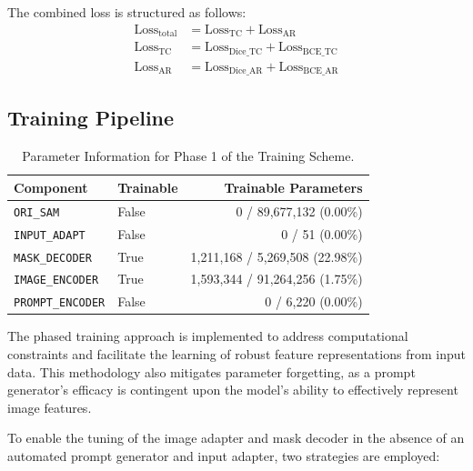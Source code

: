 The combined loss is structured as follows:
\begin{align*}
    \text{Loss}_{\text{total}} &= \text{Loss}_{\text{TC}} + \text{Loss}_{\text{AR}} \\
    \text{Loss}_{\text{TC}} &= \text{Loss}_{\text{Dice\_TC}} + \text{Loss}_{\text{BCE\_TC}} \\
    \text{Loss}_{\text{AR}} &= \text{Loss}_{\text{Dice\_AR}} + \text{Loss}_{\text{BCE\_AR}}
\end{align*}


\subsection{Training Pipeline}

\begin{table}[h!]
    \centering
    \caption{Parameter Information for Phase 1 of the Training Scheme.}
    \label{tab:phase1_params} %
    \begin{tabular}{l | l | r}
        \hline
        \textbf{Component} & \textbf{Trainable} & \textbf{Trainable Parameters} \\
        \hline
        \texttt{ORI\_SAM} & False & 0 / 89,677,132 (0.00\%) \\
        \texttt{INPUT\_ADAPT} & False & 0 / 51 (0.00\%) \\
        \texttt{MASK\_DECODER} & True & 1,211,168 / 5,269,508 (22.98\%) \\
        \texttt{IMAGE\_ENCODER} & True & 1,593,344 / 91,264,256 (1.75\%) \\
        \texttt{PROMPT\_ENCODER} & False & 0 / 6,220 (0.00\%) \\
        \hline
    \end{tabular}
\end{table}

The phased training approach is implemented to address computational constraints and facilitate the learning of robust feature representations from input data. This methodology also mitigates parameter forgetting, as a prompt generator's efficacy is contingent upon the model's ability to effectively represent image features.

To enable the tuning of the image adapter and mask decoder in the absence of an automated prompt generator and input adapter, two strategies are employed:

